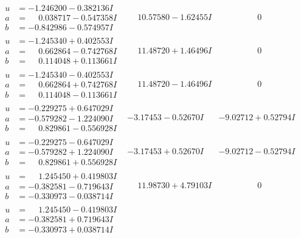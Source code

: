 \documentclass[1p]{elsarticle_modified}
\theoremstyle{definition}
\begin{document}
$$\begin{array}{c|c|c}
\begin{aligned}
u &= -1.246200 - 0.382136 I \\
a &= \phantom{-}0.038717 - 0.547358 I \\
b &= -0.842986 - 0.574957 I\end{aligned}
 & \phantom{-}10.57580 - 1.62455 I & \phantom{-0.000000 } 0 \\ \hline\begin{aligned}
u &= -1.245340 + 0.402553 I \\
a &= \phantom{-}0.662864 - 0.742768 I \\
b &= \phantom{-}0.114048 + 0.113661 I\end{aligned}
 & \phantom{-}11.48720 + 1.46496 I & \phantom{-0.000000 } 0 \\ \hline\begin{aligned}
u &= -1.245340 - 0.402553 I \\
a &= \phantom{-}0.662864 + 0.742768 I \\
b &= \phantom{-}0.114048 - 0.113661 I\end{aligned}
 & \phantom{-}11.48720 - 1.46496 I & \phantom{-0.000000 } 0 \\ \hline\begin{aligned}
u &= -0.229275 + 0.647029 I \\
a &= -0.579282 - 1.224090 I \\
b &= \phantom{-}0.829861 - 0.556928 I\end{aligned}
 & -3.17453 - 0.52670 I & -9.02712 + 0.52794 I \\ \hline\begin{aligned}
u &= -0.229275 - 0.647029 I \\
a &= -0.579282 + 1.224090 I \\
b &= \phantom{-}0.829861 + 0.556928 I\end{aligned}
 & -3.17453 + 0.52670 I & -9.02712 - 0.52794 I \\ \hline\begin{aligned}
u &= \phantom{-}1.245450 + 0.419803 I \\
a &= -0.382581 - 0.719643 I \\
b &= -0.330973 - 0.038714 I\end{aligned}
 & \phantom{-}11.98730 + 4.79103 I & \phantom{-0.000000 } 0 \\ \hline\begin{aligned}
u &= \phantom{-}1.245450 - 0.419803 I \\
a &= -0.382581 + 0.719643 I \\
b &= -0.330973 + 0.038714 I\end{aligned}

\end{array}$$
\end{document}
